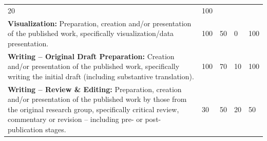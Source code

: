 \documentclass[a4paper,twoside=true,openright,parskip=full,chapterprefix=true,11pt,headings=normal,bibliography=totoc,listof=totoc,titlepage=on,captions=tableabove,draft=false]{scrreprt}
\theoremstyle{definition}
\theoremstyle{definition}
\theoremstyle{definition}
\theoremstyle{remark}
\begin{document}
\begin{longtable}[]{@{}lllll@{}}
\begin{minipage}[t]{0.10\columnwidth}
20\strut
\end{minipage} & \begin{minipage}[t]{0.07\columnwidth}\raggedright
100\strut
\end{minipage}\tabularnewline
\begin{minipage}[t]{0.49\columnwidth}\raggedright
\textbf{Visualization:} Preparation, creation and/or presentation of the
published work, specifically visualization/data presentation.\strut
\end{minipage} & \begin{minipage}[t]{0.11\columnwidth}\raggedright
100\strut
\end{minipage} & \begin{minipage}[t]{0.09\columnwidth}\raggedright
50\strut
\end{minipage} & \begin{minipage}[t]{0.10\columnwidth}\raggedright
0\strut
\end{minipage} & \begin{minipage}[t]{0.07\columnwidth}\raggedright
100\strut
\end{minipage}\tabularnewline
\begin{minipage}[t]{0.49\columnwidth}\raggedright
\textbf{Writing -- Original Draft Preparation:} Creation and/or
presentation of the published work, specifically writing the initial
draft (including substantive translation).\strut
\end{minipage} & \begin{minipage}[t]{0.11\columnwidth}\raggedright
100\strut
\end{minipage} & \begin{minipage}[t]{0.09\columnwidth}\raggedright
70\strut
\end{minipage} & \begin{minipage}[t]{0.10\columnwidth}\raggedright
10\strut
\end{minipage} & \begin{minipage}[t]{0.07\columnwidth}\raggedright
100\strut
\end{minipage}\tabularnewline
\begin{minipage}[t]{0.49\columnwidth}\raggedright
\textbf{Writing -- Review \& Editing:} Preparation, creation and/or
presentation of the published work by those from the original research
group, specifically critical review, commentary or revision -- including
pre- or post-publication stages.\strut
\end{minipage} & \begin{minipage}[t]{0.11\columnwidth}\raggedright
30\strut
\end{minipage} & \begin{minipage}[t]{0.09\columnwidth}\raggedright
50\strut
\end{minipage} & \begin{minipage}[t]{0.10\columnwidth}\raggedright
20\strut
\end{minipage} & \begin{minipage}[t]{0.07\columnwidth}\raggedright
50\strut
\end{minipage}\tabularnewline
\bottomrule
\end{longtable}
\end{document}
